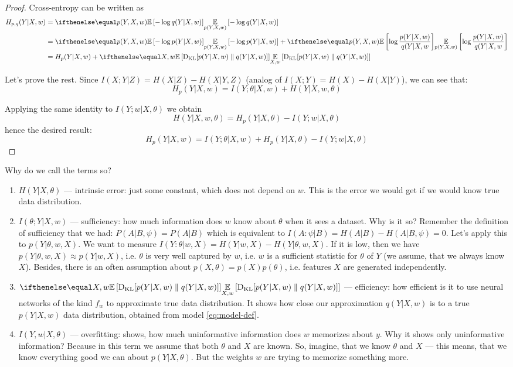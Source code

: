 \documentclass{article}
\begin{document}
\begin{proof}
Cross-entropy can be written as
\begin{equation}
\begin{split}
H_{p,q}(Y|X,w)
&= \expect[p(Y,X,w)]{-\log q(Y|X,w)}
\\
&= \expect[p(Y,X,w)]{-\log p(Y|X,w)} + \expect[p(Y,X,w)]{\log\frac{p(Y|X,w)}{q(Y|X,w}}
\\
&= H_p(Y|X,w) + \expect[X,w]{\kl{p(Y|X,w)}{q(Y|X,w)}}
\end{split}
\end{equation}

Let's prove the rest.
Since $I(X;Y|Z) = H(X|Z) - H(X|Y,Z)$ (analog of $I(X;Y) = H(X) - H(X|Y)$), we can see that:
\[
H_p(Y|X,w) = I(Y;\theta | X,w) + H(Y|X,w,\theta)
\]

Applying the same identity to $I(Y;w|X,\theta)$ we obtain
\[
H(Y|X,w,\theta) = H_p(Y|X,\theta) - I(Y;w|X,\theta)
\]
hence the desired result:
\[
H_p(Y|X,w) = I(Y;\theta | X,w) + H_p(Y|X,\theta) - I(Y;w|X,\theta)
\]
\end{proof}

Why do we call the terms so?
\begin{enumerate}
    \item $H(Y|X,\theta)$ --- intrinsic error: just some constant, which does not depend on $w$. This is the error we would get if we would know true data distribution.
    \item $I(\theta; Y | X,w)$ --- sufficiency: how much information does $w$ know about $\theta$ when it sees a dataset. Why is it so? Remember the definition of sufficiency that we had: $P(A|B,\psi) = P(A|B)$ which is equivalent to $I(A : \psi |B ) = H(A | B) - H(A | B, \psi) = 0$. Let's apply this to $p(Y|\theta, w, X)$. We want to measure $I(Y:\theta | w, X) = H(Y | w, X) - H(Y | \theta, w, X)$. If it is low, then we have $p(Y | \theta, w, X) \approx p(Y | w, X)$, i.e. $\theta$ is very well captured by $w$, i.e. $w$ is a sufficient statistic for $\theta$ of $Y$ (we assume, that we always know $X$). Besides, there is an often assumption about $p(X,\theta) = p(X)p(\theta)$, i.e. features $X$ are generated independently.
    \item $\expect[X,w]{\kl{p(Y|X,w)}{q(Y|X,w)}}$ --- efficiency: how efficient is it to use neural networks of the kind $f_w$ to approximate true data distribution. It shows how close our approximation $q(Y|X,w)$ is to a true $p(Y|X,w)$ data distribution, obtained from model \eqref{eq:model-def}.
    \item $I(Y,w|X,\theta)$ --- overfitting: shows, how much uninformative information does $w$ memorizes about $y$. Why it shows only uninformative information? Because in this term we assume that both $\theta$ and $X$ are known. So, imagine, that we know $\theta$ and $X$ --- this means, that we know everything good we can about $p(Y|X,\theta)$. But the weights $w$ are trying to memorize something more.
\end{enumerate}
\end{document}
